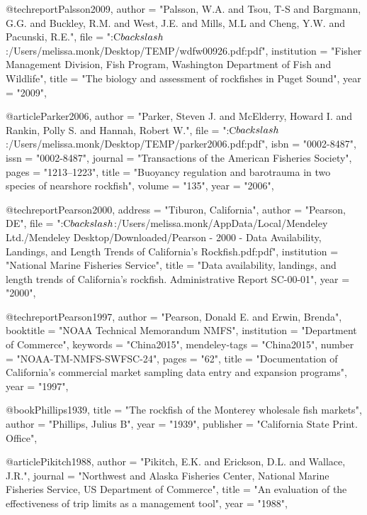 @techreport{Palsson2009,
    author = "{Palsson, W.A. and Tsou, T-S and Bargmann, G.G. and Buckley, R.M. and West, J.E. and Mills, M.L and Cheng, Y.W. and Pacunski, R.E.}",
    file = "{:C$\\backslash$:/Users/melissa.monk/Desktop/TEMP/wdfw00926.pdf:pdf}",
    institution = "{Fisher Management Division, Fish Program, Washington Department of Fish and Wildlife}",
    title = "{{The biology and assessment of rockfishes in Puget Sound}}",
    year = "{2009}",
}

@article{Parker2006,
    author = "{Parker, Steven J. and McElderry, Howard I. and Rankin, Polly S. and Hannah, Robert W.}",
    file = "{:C$\\backslash$:/Users/melissa.monk/Desktop/TEMP/parker2006.pdf:pdf}",
    isbn = "{0002-8487}",
    issn = "{0002-8487}",
    journal = "{Transactions of the American Fisheries Society}",
    pages = "{1213--1223}",
    title = "{{Buoyancy regulation and barotrauma in two species of nearshore rockfish}}",
    volume = "{135}",
    year = "{2006}",
}

@techreport{Pearson2000,
    address = "{Tiburon, California}",
    author = "{Pearson, DE}",
    file = "{:C$\\backslash$:/Users/melissa.monk/AppData/Local/Mendeley Ltd./Mendeley Desktop/Downloaded/Pearson - 2000 - Data Availability, Landings, and Length Trends of California's Rockfish.pdf:pdf}",
    institution = "{National Marine Fisheries Service}",
    title = "{{Data availability, landings, and length trends of California's rockfish. Administrative Report SC-00-01}}",
    year = "{2000}",
}

@techreport{Pearson1997,
    author = "{Pearson, Donald E. and Erwin, Brenda}",
    booktitle = "{NOAA Technical Memorandum NMFS}",
    institution = "{Department of Commerce}",
    keywords = "{China2015}",
    mendeley-tags = "{China2015}",
    number = "{NOAA-TM-NMFS-SWFSC-24}",
    pages = "{62}",
    title = "{{Documentation of California's commercial market sampling data entry and expansion programs}}",
    year = "{1997}",
}

@book{Phillips1939,
    title = "{The rockfish of the Monterey wholesale fish markets}",
    author = "{Phillips, Julius B}",
    year = "{1939}",
    publisher = "{California State Print. Office}",
}

@article{Pikitch1988,
    author = "{Pikitch, E.K. and Erickson, D.L. and Wallace, J.R.}",
    journal = "{Northwest and Alaska Fisheries Center, National Marine Fisheries Service, US Department of Commerce}",
    title = "{{An evaluation of the effectiveness of trip limits as a management tool}}",
    year = "{1988}",
}

